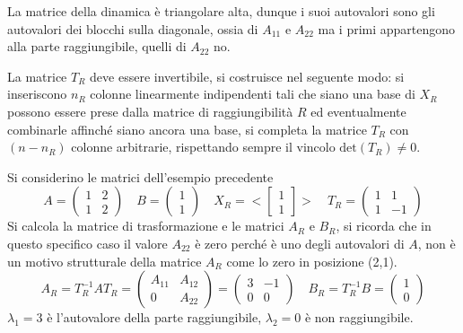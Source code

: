 La matrice della dinamica è triangolare alta, dunque i suoi autovalori sono gli
autovalori dei blocchi sulla diagonale, ossia di $A_{11}$ e $A_{22}$ ma i primi
appartengono alla parte raggiungibile, quelli di $A_{22}$ no.

La matrice $T_R$ deve essere invertibile, si costruisce nel seguente modo: si
inseriscono $n_R$ colonne linearmente indipendenti tali che siano una base di
$X_R$ possono essere prese dalla matrice di raggiungibilità $R$ ed
eventualmente combinarle affinché siano ancora una base, si completa la matrice
$T_R$ con $(n-n_R)$ colonne arbitrarie, rispettando sempre il
vincolo $\text{det}(T_R)\neq 0$.

Si considerino le matrici dell'esempio precedente
$$
A=\begin{pmatrix}
1 & 2 \\
1 & 2
\end{pmatrix} \quad
B=\begin{pmatrix}
1 \\ 1
\end{pmatrix} \quad
X_R = <\begin{bmatrix}
1 \\ 1
\end{bmatrix}> \quad
T_R = \begin{pmatrix}
1 & 1 \\
1 & -1
\end{pmatrix}$$
Si calcola la matrice di trasformazione e le matrici $A_R$ e $B_R$, si ricorda
che in questo specifico caso il valore $A_{22}$ è zero perché è uno
degli autovalori di $A$, non è un motivo strutturale della matrice $A_R$ come
lo zero in posizione (2,1).
$$
A_R = T_R^{-1}AT_R = \begin{pmatrix}
A_{11} & A_{12} \\
0 & A_{22}
\end{pmatrix}=
\begin{pmatrix}
3 & -1 \\
0 & 0
\end{pmatrix}\quad
B_R = T_R^{-1}B = \begin{pmatrix}
1 \\ 0
\end{pmatrix}
$$
$\lambda_1=3$ è l'autovalore della parte raggiungibile, $\lambda_2=0$ è non
raggiungibile.

